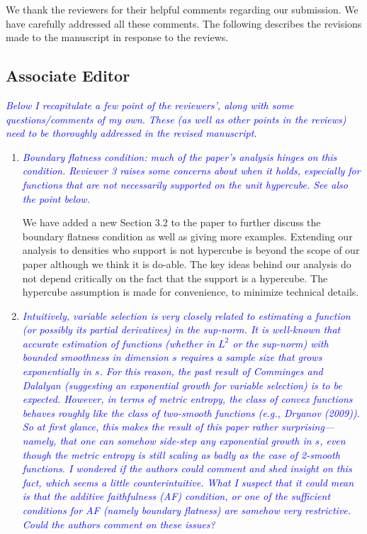 \documentclass[pdftex,12pt]{article}
\def\rc#1{{\it\textcolor{blue}{#1}}\smallskip}
\begin{document}
\vspace*{5pt}

We thank the reviewers for their helpful comments regarding our
submission. We have carefully addressed all these comments. The
following describes the revisions made to the manuscript in response
to the reviews.

\subsection*{Associate Editor}

\rc{Below I recapitulate a few
point of the reviewers', along with some questions/comments of my own.
These (as well as other points in the reviews) need to be thoroughly
addressed in the revised manuscript.}

\begin{enumerate}
\item \rc{Boundary flatness condition: much of the paper's analysis hinges on
this condition.  Reviewer 3 raises some concerns about when it holds,
especially for functions that are not necessarily supported on the
unit hypercube.  See also the point below.}

We have added a new Section 3.2 to the paper to further discuss the boundary flatness condition as well as giving more examples. Extending our analysis to densities who support is not hypercube is beyond the scope of our paper although we think it is do-able. The key ideas behind our analysis do not depend critically on the fact that the support is a hypercube. The hypercube assumption is made for convenience, to minimize technical details.

\item \rc{Intuitively, variable selection is very closely related to
estimating a function (or possibly its partial derivatives) in the
sup-norm.  It is well-known that accurate estimation of functions
(whether in $L^2$ or the sup-norm) with bounded smoothness in dimension
$s$ requires a sample size that grows exponentially in $s$.  For this
reason, the past result of Comminges and Dalalyan (suggesting an
exponential growth for variable selection) is to be expected.
However, in terms of metric entropy, the class of convex functions
behaves roughly like the class of two-smooth functions (e.g., Dryanov
(2009)).  So at first glance, this makes the result of this paper
rather surprising---namely, that one can somehow side-step any
exponential growth in $s$, even though the metric entropy is still
scaling as badly as the case of 2-smooth functions.  I wondered if the
authors could comment and shed insight on this fact, which seems a
little counterintuitive.  What I suspect that it could mean is that
the additive faithfulness (AF) condition, or one of the sufficient
conditions for AF (namely boundary flatness) are somehow very
restrictive.  Could the authors comment on these issues?}


\end{enumerate}
\end{document}
